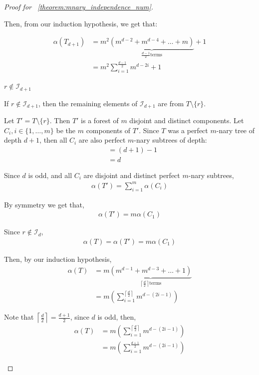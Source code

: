 \documentclass{amsart}
\theoremstyle{definition}
\begin{document}
\begin{proof}[Proof for ~\ref{theorem:mnary_independence_num}]
\begin{caseof}
\begin{subcaseof}
			Then, from our induction hypothesis, we get that:

			\begin{align}
				\alpha(T_{d+1}) & = m^2\underbrace{(m^{d - 2} + m^{d - 4} + \ldots + m)}_{\frac{d-1}{2} \text{terms}} + 1                           \nonumber \\
						& = m^2\displaystyle\sum_{i = 1}^{\frac{d-1}{2}}m^{d - 2i} + 1 	
			\label{eq:mnary_odd_case}
			\end{align}


		\item $r \not\in \mathcal{I}_{d + 1}$

			If $r \not\in \mathcal{I}_{d + 1}$, then the remaining elements of $\mathcal{I}_{d + 1}$ are from $T \setminus \{r\}$.

			Let $T' = T\setminus\{r\}$. Then $T'$ is a forest of $m$ disjoint and distinct components. Let $C_i, i \in \{1, \dots, m\}$ be the $m$ components of $T'$. Since $T$ was a perfect $m$-nary tree of depth $d + 1$, then all $C_i$ are also perfect $m$-nary subtrees of depth:
			\begin{align*}
				 & = (d + 1) - 1 \\
				 & = d
			\end{align*}

			Since $d$ is odd, and all $C_i$ are disjoint and distinct perfect $m$-nary subtrees,
			\begin{align*}
				\alpha(T') = \displaystyle\sum_{i = 1}^{m}\alpha(C_i)
			\end{align*}

			By symmetry we get that,
			\begin{align*}
				\alpha(T') = m \alpha(C_1)
			\end{align*}

			Since $r \not\in \mathcal{I}_d$,
			\begin{align*}
				\alpha(T) = \alpha(T') = m \alpha(C_1)
			\end{align*}

			Then, by our induction hypothesis,
			\begin{align}
				\alpha(T) & = m\underbrace{(m^{d - 1} + m^{d - 3} + \dots + 1)}_{\left\lceil\frac{d}{2}\right\rceil \text{terms}}          \nonumber \\
					  & = m\left(\displaystyle\sum_{i = 1}^{\left\lceil\frac{d}{2}\right\rceil}m^{d - (2i - 1)}\right) \nonumber
			\end{align}

			Note that $\left\lceil\frac{d}{2}\right\rceil = \frac{d + 1}{2}$, since $d$ is odd, then,
			\begin{align}
				\alpha(T) & = m\left(\displaystyle\sum_{i = 1}^{\left\lceil\frac{d}{2}\right\rceil}m^{d - (2i - 1)}\right) \nonumber \\
					  & = m\left(\displaystyle\sum_{i = 1}^{\frac{d + 1}{2}}m^{d - (2i - 1)}\right)  \label{eq:mnary_even_case} 
			\end{align}



\end{subcaseof}
\end{caseof}
\end{proof}
\end{document}
